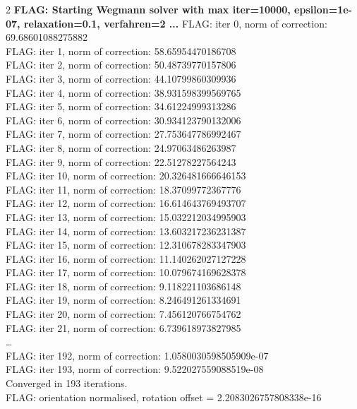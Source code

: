 \begin{tiny}
\begin{multicols}{2}
\textbf{FLAG: Starting Wegmann solver with max iter=10000, epsilon=1e-07, relaxation=0.1, verfahren=2 ...}
FLAG: iter 0, norm of correction: 69.68601088275882 \\
FLAG: iter 1, norm of correction: 58.65954470186708 \\
FLAG: iter 2, norm of correction: 50.48739770157806 \\
FLAG: iter 3, norm of correction: 44.10799860309936 \\
FLAG: iter 4, norm of correction: 38.931598399569765 \\
FLAG: iter 5, norm of correction: 34.61224999313286 \\
FLAG: iter 6, norm of correction: 30.934123790132006 \\
FLAG: iter 7, norm of correction: 27.753647786992467 \\
FLAG: iter 8, norm of correction: 24.97063486263987 \\
FLAG: iter 9, norm of correction: 22.51278227564243 \\
FLAG: iter 10, norm of correction: 20.326481666646153 \\
FLAG: iter 11, norm of correction: 18.37099772367776 \\
FLAG: iter 12, norm of correction: 16.614643769493707 \\
FLAG: iter 13, norm of correction: 15.032212034995903 \\
FLAG: iter 14, norm of correction: 13.603217236231387 \\
FLAG: iter 15, norm of correction: 12.310678283347903 \\
FLAG: iter 16, norm of correction: 11.140262027127228 \\
FLAG: iter 17, norm of correction: 10.079674169628378 \\
FLAG: iter 18, norm of correction: 9.118221103686148 \\
FLAG: iter 19, norm of correction: 8.246491261334691 \\
FLAG: iter 20, norm of correction: 7.456120766754762 \\
FLAG: iter 21, norm of correction: 6.739618973827985 \\
\dots \\
FLAG: iter 192, norm of correction: 1.0580030598505909e-07 \\
FLAG: iter 193, norm of correction: 9.522027559088519e-08 \\
Converged in 193 iterations. \\
FLAG: orientation normalised, rotation offset = 2.2083026757808338e-16 \\

\end{multicols}
\end{tiny}
